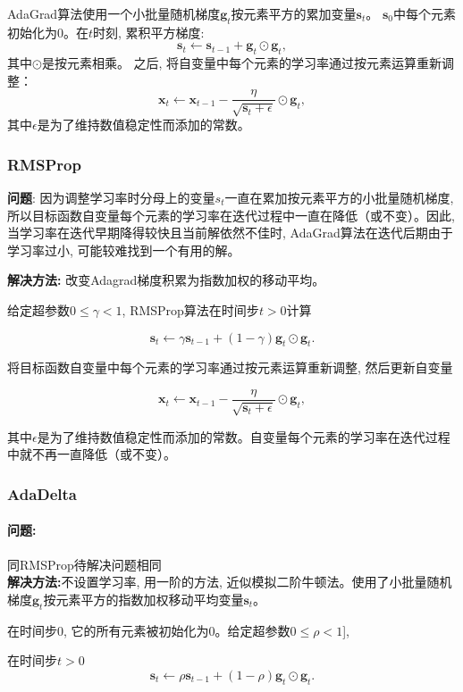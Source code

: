 \documentclass[a4paper]{article}
\begin{document}
AdaGrad算法使用一个小批量随机梯度$\boldsymbol{g}_t$按元素平方的累加变量$\boldsymbol{s}_t$。 $\boldsymbol{s}_0$中每个元素初始化为0。在$t$时刻, 累积平方梯度:
$$\boldsymbol{s}_t \leftarrow \boldsymbol{s}_{t-1} + \boldsymbol{g}_t \odot \boldsymbol{g}_t, $$
其中$\odot$是按元素相乘。
之后, 将自变量中每个元素的学习率通过按元素运算重新调整：
$$\boldsymbol{x}_t \leftarrow \boldsymbol{x}_{t-1} - \frac{\eta}{\sqrt{\boldsymbol{s}_t + \epsilon}} \odot \boldsymbol{g}_t, $$
其中$\epsilon$是为了维持数值稳定性而添加的常数。 

\subsubsection{RMSProp}
\textbf{问题}: 因为调整学习率时分⺟上的变量$s_t$⼀直在累加按元素平方的小批量随机梯度, 所以⽬标函数⾃变量每个元素的学习率在迭代过程中⼀直在降低（或不变）。因此, 当学习率在迭代早期降得较快且当前解依然不佳时, AdaGrad算法在迭代后期由于学习率过小, 可能较难找到一个有用的解。

 \textbf{解决方法:} 改变Adagrad梯度积累为指数加权的移动平均。
 
给定超参数$0 \leq \gamma < 1$, RMSProp算法在时间步$t>0$计算

$$\boldsymbol{s}_t \leftarrow \gamma \boldsymbol{s}_{t-1} + (1 - \gamma) \boldsymbol{g}_t \odot \boldsymbol{g}_t. $$

将目标函数自变量中每个元素的学习率通过按元素运算重新调整, 然后更新自变量

$$\boldsymbol{x}_t \leftarrow \boldsymbol{x}_{t-1} - \frac{\eta}{\sqrt{\boldsymbol{s}_t + \epsilon}} \odot \boldsymbol{g}_t,  $$

其中$\epsilon$是为了维持数值稳定性而添加的常数。自变量每个元素的学习率在迭代过程中就不再一直降低（或不变）。
\subsubsection{AdaDelta}
\paragraph{问题:}同RMSProp待解决问题相同 \\
\textbf{解决方法:}不设置学习率, 用一阶的方法, 近似模拟二阶牛顿法。使用了小批量随机梯度$\boldsymbol{g}_t$按元素平方的指数加权移动平均变量$\boldsymbol{s}_t$。

在时间步0, 它的所有元素被初始化为0。给定超参数$0 \leq \rho < 1$], 

在时间步$t>0$
$$\boldsymbol{s}_t \leftarrow \rho \boldsymbol{s}_{t-1} + (1 - \rho) \boldsymbol{g}_t \odot \boldsymbol{g}_t. $$
\end{document}
